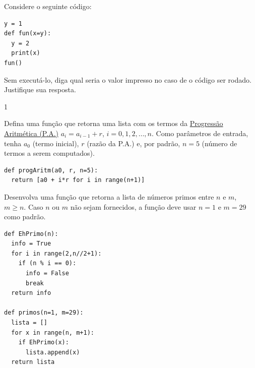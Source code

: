 \begin{exer}
  Considere o seguinte código:

\begin{lstlisting}
y = 1
def fun(x=y):
  y = 2
  print(x)
fun()
\end{lstlisting}
  
Sem executá-lo, diga qual seria o valor impresso no caso de o código ser rodado. Justifique sua resposta.
\end{exer}
\begin{resp}
  1
\end{resp}

\begin{exer}
  Defina uma função {\python} que retorna uma lista com os termos da \href{https://pt.wikipedia.org/wiki/Progress\%C3\%A3o_aritm\%C3\%A9tica}{Progressão Aritmética (P.A.)} $a_i = a_{i-1} + r$, $i = 0, 1, 2, \dotsc, n$. Como parâmetros de entrada, tenha $a_0$ (termo inicial), $r$ (razão da P.A.) e, por padrão, $n = 5$ (número de termos a serem computados).
\end{exer}
\begin{resp}

\begin{lstlisting}
def progAritm(a0, r, n=5):
  return [a0 + i*r for i in range(n+1)]
\end{lstlisting}

\end{resp}

\begin{exer}
  Desenvolva uma função que retorna a lista de números primos entre $n$ e $m$, $m\geq n$. Caso $n$ ou $m$ não sejam fornecidos, a função deve usar $n=1$ e $m=29$ como padrão.
\end{exer}
\begin{resp}

\begin{lstlisting}
def EhPrimo(n):
  info = True
  for i in range(2,n//2+1):
    if (n % i == 0):
      info = False
      break
  return info

def primos(n=1, m=29):
  lista = []
  for x in range(n, m+1):
    if EhPrimo(x):
      lista.append(x)
  return lista
\end{lstlisting}

\end{resp}

